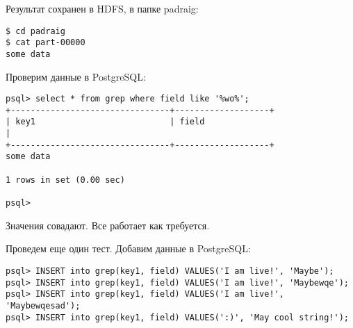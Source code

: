 \begin{lstlisting}[label=lst:haddop25,caption=Тестирование]
\end{lstlisting}

Результат сохранен в HDFS, в папке padraig:
\begin{lstlisting}[label=lst:haddop26,caption=Тестирование]
$ cd padraig
$ cat part-00000
some data
\end{lstlisting}

Проверим данные в PostgreSQL:
\begin{lstlisting}[label=lst:haddop27,caption=Тестирование]
psql> select * from grep where field like '%wo%';
+--------------------------------+-------------------+
| key1                           | field
|
+--------------------------------+-------------------+
some data

1 rows in set (0.00 sec)

psql>
\end{lstlisting}

Значения совадают. Все работает как требуется.

Проведем еще один тест. Добавим данные в PostgreSQL:
\begin{lstlisting}[label=lst:haddop27:1,caption=Тестирование]
psql> INSERT into grep(key1, field) VALUES('I am live!', 'Maybe');
psql> INSERT into grep(key1, field) VALUES('I am live!', 'Maybewqe');
psql> INSERT into grep(key1, field) VALUES('I am live!', 'Maybewqesad');
psql> INSERT into grep(key1, field) VALUES(':)', 'May cool string!');
\end{lstlisting}

